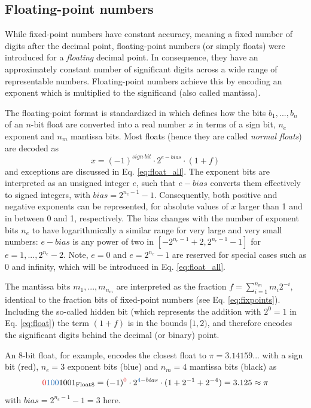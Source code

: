 \subsection{Floating-point numbers}
\label{sec:floats}

While fixed-point numbers have constant accuracy, meaning a fixed number of digits after the decimal point, floating-point
numbers (or simply floats) were introduced for a \emph{floating} decimal point. In consequence, they have an approximately constant
number of significant digits across a wide range of representable numbers. Floating-point numbers achieve this by
encoding an exponent which is multiplied to the significand (also called mantissa).

The floating-point format is standardized in \cite{IEEE1985,IEEE2008} which defines how the bits $b_1,...,b_n$ of an
$n$-bit float are converted into a real number $x$ in terms of a sign bit, $n_e$ exponent and $n_m$ mantissa bits.
Most floats (hence they are called \emph{normal floats}) are decoded as
\begin{equation}
x = (-1)^{sign~bit} \cdot 2^{e-bias} \cdot (1+f)
\label{eq:float}
\end{equation}
and exceptions are discussed in Eq. \ref{eq:float_all}. The exponent bits are interpreted as an unsigned integer $e$, such that $e-bias$ converts
them effectively to signed integers, with $bias = 2^{n_e-1}-1$. Consequently, both positive and negative exponents can be represented,
for absolute values of $x$ larger than 1 and in between 0 and 1, respectively. The bias changes with the number of exponent
bits $n_e$ to have logarithmically a similar range for very large and very small numbers: $e-bias$ is any power of two in
$[-2^{n_e-1}+2,2^{n_e-1}-1]$ for $e=1,...,2^{n_e}-2$. Note, $e=0$ and $e=2^{n_e}-1$ are reserved for special cases such as 0 and infinity,
which will be introduced in Eq. \ref{eq:float_all}.

The mantissa bits $m_1,...,m_{n_m}$ are interpreted as the fraction $f = \sum_{i=1}^{n_m} m_i 2^{-i}$, identical to the fraction bits
of fixed-point numbers (see Eq. \ref{eq:fixpoints}). Including the so-called hidden bit (which represents the addition with $2^0 = 1$
in Eq. \ref{eq:float}) the term $(1+f)$ is in the bounds $[1,2)$, and therefore encodes the significant digits behind the decimal (or binary)
point.

An 8-bit float, for example, encodes the closest float to $\pi = 3.14159...$ with a sign bit (red), $n_e = 3$ exponent bits (blue) and
$n_m=4$ mantissa bits (black) as
\begin{equation}
{\color{psign}0}{\color{pexpo}100}1001_{\op{Float8}} = (-1)^{\color{psign}0} \cdot 2^{{\color{pexpo}4}-bias}
\cdot (1+2^{-1}+2^{-4}) = 3.125 \approx \pi
\label{eq:float8}
\end{equation}
with $bias=2^{n_e-1} - 1 = 3$ here.

